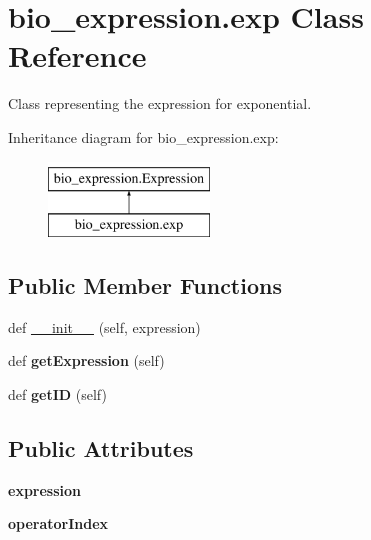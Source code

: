 \hypertarget{classbio__expression_1_1exp}{}\section{bio\+\_\+expression.\+exp Class Reference}
\label{classbio__expression_1_1exp}


Class representing the expression for exponential.  


Inheritance diagram for bio\+\_\+expression.\+exp\+:\begin{figure}[H]
\begin{center}
\leavevmode
\includegraphics[height=2.000000cm]{classbio__expression_1_1exp}
\end{center}
\end{figure}
\subsection*{Public Member Functions}
\begin{DoxyCompactItemize}
\item 
def \hyperlink{classbio__expression_1_1exp_a282c1a261fa5aea973c94887cd314aa7}{\+\_\+\+\_\+init\+\_\+\+\_\+} (self, expression)
\item 
def {\bfseries get\+Expression} (self)\hypertarget{classbio__expression_1_1exp_a1c8a2e4276953b72088b39542728a5cc}{}\label{classbio__expression_1_1exp_a1c8a2e4276953b72088b39542728a5cc}

\item 
def {\bfseries get\+ID} (self)\hypertarget{classbio__expression_1_1exp_a061ceabb8bd6576f6438f2568fa763be}{}\label{classbio__expression_1_1exp_a061ceabb8bd6576f6438f2568fa763be}

\end{DoxyCompactItemize}
\subsection*{Public Attributes}
\begin{DoxyCompactItemize}
\item 
{\bfseries expression}\hypertarget{classbio__expression_1_1exp_a9590d174f4e17fcf29d14c458d4e4e29}{}\label{classbio__expression_1_1exp_a9590d174f4e17fcf29d14c458d4e4e29}

\item 
{\bfseries operator\+Index}\hypertarget{classbio__expression_1_1exp_ae8ade0c740b0b6732ddacc6f247284bb}{}\label{classbio__expression_1_1exp_ae8ade0c740b0b6732ddacc6f247284bb}

\end{DoxyCompactItemize}


